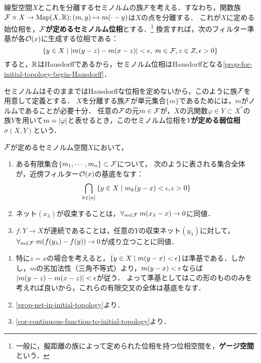 \documentclass[uplatex,dvipdfmx]{jsreport}
\begin{document}
\begin{definition}\label{def-seminorm-topology}
    線型空間$X$とこれを分離するセミノルムの族$\mathcal{F}$を考える．すなわち，関数族$\mathcal{F}\times X\to\mathrm{Map}(X,\mathbb{R});(m,y)\mapsto m(\cdot-y)$は$X$の点を分離する．
    これが$X$に定める始位相を，\textbf{$\mathcal{F}$が定めるセミノルム位相}とする．\footnote{一般に，擬距離の族によって定められた位相を持つ位相空間を，\textbf{ゲージ空間}という．}
    換言すれば，次のフィルター準基が各$\mathcal{O}(x)$に生成する位相である：
    \[\left\{y\in X\mid\lvert m(y-z)-m(x-z)\rvert<\epsilon,\;m\in\mathcal{F},z\in Z,\epsilon>0\right\}\]
    すると，$\mathbb{R}$はHausdorffであるから，セミノルム位相はHausdorffとなる\ref{prop-for-initial-topology-begin-Hausdorff}．
\end{definition}
\begin{remarks}
    セミノルムはそのままではHausdorffな位相を定めないから，このように族$\mathcal{F}$を用意して定義とする．
    $X$を分離する族$\mathcal{F}$が単元集合$\{m\}$であるためには，$m$がノルムであることが必要十分．
    任意の$\mathcal{F}$の元$m\in\mathcal{F}$が，$X$の汎関数$\varphi\in Y\subset X^*$の族$Y$を用いて$m=\lvert\varphi\rvert$と表せるとき，このセミノルム位相を\textbf{$Y$が定める弱位相}$\sigma(X,Y)$という．
\end{remarks}

\begin{lemma}[セミノルム位相の性質]
    $\mathcal{F}$が定めるセミノルム空間$X$において，
    \begin{enumerate}
        \item ある有限集合$\{m_1,\cdots,m_n\}\subset\mathcal{F}$について，
        次のように表される集合全体が，近傍フィルター$\mathcal{O}(x)$の基底をなす：
        \[\bigcap_{k\in[n]}\left\{y\in X\mid m_k(y-x)<\epsilon,\epsilon>0\right\}\]
        \item ネット$(x_\lambda)$が収束することは，$\forall_{m\in\mathcal{F}}\;m(x_\lambda-x)\to0$に同値．
        \item $f:Y\to X$が連続であることは，任意の$Y$の収束ネット$(y_\lambda)$に対して，$\forall_{m\in\mathcal{F}}\;m(f(y_\lambda)-f(y))\to 0$が成り立つことに同値．
    \end{enumerate}
\end{lemma}
\begin{Proof}\mbox{}
    \begin{enumerate}
        \item 特に$z=x$の場合を考えると，$\{y\in X\mid m(y-x)<\epsilon\}$は準基である．しかし，$m$の劣加法性（三角不等式）より，$m(y-x)<\epsilon$ならば$\lvert m(y-z)-m(x-z)\rvert<\epsilon$が従う．
        よって準基としてはこの形のもののみを考えれば良いから，これらの有限交叉の全体は基底をなす．
        \item \ref{prop-net-in-initial-topology}より．
        \item \ref{cor-continuous-function-to-initial-topology}より．
    \end{enumerate}
\end{Proof}
\end{document}
